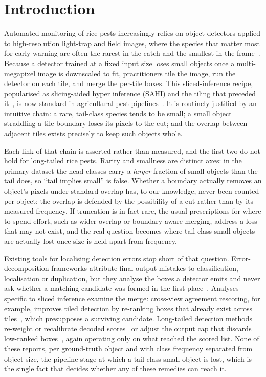 \section{Introduction}\label{sec:intro}

Automated monitoring of rice pests increasingly relies on object detectors applied to high-resolution light-trap and field images, where the species that matter most for early warning are often the rarest in the catch and the smallest in the frame~\citep{mo2025ricepest,li2026agrisurvey}. Because a detector trained at a fixed input size loses small objects once a multi-megapixel image is downscaled to fit, practitioners tile the image, run the detector on each tile, and merge the per-tile boxes. This sliced-inference recipe, popularised as slicing-aided hyper inference (SAHI) and the tiling that preceded it~\citep{akyon2022sahi,unel2019tiling}, is now standard in agricultural pest pipelines~\citep{fotouhi2024sticky,ye2024teasahi,wei2026yolousw}. It is routinely justified by an intuitive chain: a rare, tail-class species tends to be small; a small object straddling a tile boundary loses its pixels to the cut; and the overlap between adjacent tiles exists precisely to keep such objects whole.

Each link of that chain is asserted rather than measured, and the first two do not hold for long-tailed rice pests. Rarity and smallness are distinct axes: in the primary dataset the head classes carry a \emph{larger} fraction of small objects than the tail does, so ``tail implies small'' is false. Whether a boundary actually removes an object's pixels under standard overlap has, to our knowledge, never been counted per object; the overlap is defended by the possibility of a cut rather than by its measured frequency. If truncation is in fact rare, the usual prescriptions for where to spend effort, such as wider overlap or boundary-aware merging, address a loss that may not exist, and the real question becomes where tail-class small objects are actually lost once size is held apart from frequency.

Existing tools for localising detection errors stop short of that question. Error-decomposition frameworks attribute final-output mistakes to classification, localisation or duplication, but they analyse the boxes a detector emits and never ask whether a matching candidate was formed in the first place~\citep{hoiem2012diagnosing,bolya2020tide}. Analyses specific to sliced inference examine the merge: cross-view agreement rescoring, for example, improves tiled detection by re-ranking boxes that already exist across tiles~\citep{na2026crossview}, which presupposes a surviving candidate. Long-tailed detection methods re-weight or recalibrate decoded scores~\citep{pan2021norcal,alexandridis2025fracal} or adjust the output cap that discards low-ranked boxes~\citep{dave2021devil}, again operating only on what reached the scored list. None of these reports, per ground-truth object and with class frequency separated from object size, the pipeline stage at which a tail-class small object is lost, which is the single fact that decides whether any of these remedies can reach it.

